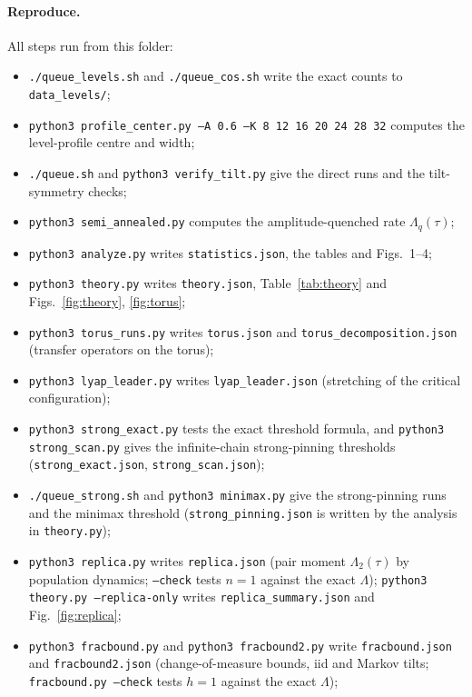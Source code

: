 \documentclass[10pt,a4paper]{article}
\begin{document}
\paragraph{Reproduce.}\sloppy
All steps run from this folder:
\begin{itemize}
\item \texttt{./queue\_levels.sh} and \texttt{./queue\_cos.sh} write the exact counts to \texttt{data\_levels/};
\item \texttt{python3 profile\_center.py --A 0.6 --K 8 12 16 20 24 28 32} computes the level-profile centre and width;
\item \texttt{./queue.sh} and \texttt{python3 verify\_tilt.py} give the direct runs and the tilt-symmetry checks;
\item \texttt{python3 semi\_annealed.py} computes the amplitude-quenched rate $\Lambda_q(\tau)$;
\item \texttt{python3 analyze.py} writes \texttt{statistics.json}, the tables and Figs.~1--4;
\item \texttt{python3 theory.py} writes \texttt{theory.json}, Table~\ref{tab:theory} and Figs.~\ref{fig:theory}, \ref{fig:torus};
\item \texttt{python3 torus\_runs.py} writes \texttt{torus.json} and \texttt{torus\_decomposition.json} (transfer operators on the torus);
\item \texttt{python3 lyap\_leader.py} writes \texttt{lyap\_leader.json} (stretching of the critical configuration);
\item \texttt{python3 strong\_exact.py} tests the exact threshold formula, and \texttt{python3 strong\_scan.py} gives the infinite-chain strong-pinning thresholds (\texttt{strong\_exact.json}, \texttt{strong\_scan.json});
\item \texttt{./queue\_strong.sh} and \texttt{python3 minimax.py} give the strong-pinning runs and the minimax threshold (\texttt{strong\_pinning.json} is written by the analysis in \texttt{theory.py});
\item \texttt{python3 replica.py} writes \texttt{replica.json} (pair moment $\Lambda_2(\tau)$ by population dynamics; \texttt{--check} tests $n=1$ against the exact $\Lambda$); \texttt{python3 theory.py --replica-only} writes \texttt{replica\_summary.json} and Fig.~\ref{fig:replica};
\item \texttt{python3 fracbound.py} and \texttt{python3 fracbound2.py} write \texttt{fracbound.json} and \texttt{fracbound2.json} (change-of-measure bounds, iid and Markov tilts; \texttt{fracbound.py --check} tests $h=1$ against the exact $\Lambda$);

\end{itemize}
\end{document}
